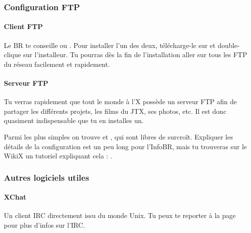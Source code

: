 \subsubsection{Configuration FTP}

\paragraph{Client FTP}
Le BR te conseille  ou . Pour installer l'un des deux, t\'el\'echarge-le sur  et double-clique sur l'installeur.
Tu pourras d\`es la fin de l'installation aller sur tous les FTP du r\'eseau
facilement et rapidement.

\paragraph{Serveur FTP}
Tu verras rapidement que tout le monde \`a  l'X poss\`ede un serveur FTP
afin de partager les diff\'erents projets, les films du JTX, ses
photos, etc. Il est donc quasiment indispensable que tu en installes
un.

Parmi les plus simples on trouve  et , qui sont libres de surcro\^{i}t. Expliquer les d\'etails de la configuration est un peu long pour l'InfoBR, mais tu trouveras sur le WikiX un tutoriel expliquant cela : .

\subsubsection{Autres logiciels utiles}

                  
  \paragraph{XChat}  Un client IRC directement issu du monde Unix.
                 Tu peux te reporter \`a  la page \pageref{irc} pour plus d'infos sur l'IRC.
                 
